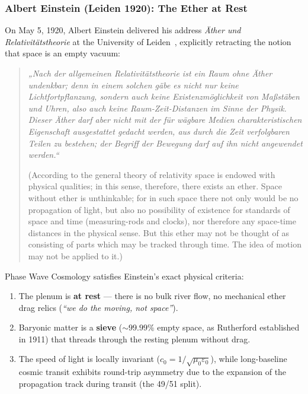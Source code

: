 \documentclass[11pt,a4paper]{article}
\begin{document}
\subsubsection{Albert Einstein (Leiden 1920): The Ether at Rest}
\label{subsubsec:einstein_leiden_1920}

On May 5, 1920, Albert Einstein delivered his address \textit{Äther und Relativitätstheorie} at the University of Leiden~\cite{Einstein1920}, explicitly retracting the notion that space is an empty vacuum:
\begin{quote}
\textit{„Nach der allgemeinen Relativitätstheorie ist ein Raum ohne Äther undenkbar; denn in einem solchen gäbe es nicht nur keine Lichtfortpflanzung, sondern auch keine Existenzmöglichkeit von Maßstäben und Uhren, also auch keine Raum-Zeit-Distanzen im Sinne der Physik. Dieser Äther darf aber nicht mit der für wägbare Medien charakteristischen Eigenschaft ausgestattet gedacht werden, aus durch die Zeit verfolgbaren Teilen zu bestehen; der Begriff der Bewegung darf auf ihn nicht angewendet werden.“}

(According to the general theory of relativity space is endowed with physical qualities; in this sense, therefore, there exists an ether. Space without ether is unthinkable; for in such space there not only would be no propagation of light, but also no possibility of existence for standards of space and time (measuring-rods and clocks), nor therefore any space-time distances in the physical sense. But this ether may not be thought of as consisting of parts which may be tracked through time. The idea of motion may not be applied to it.)
\end{quote}

Phase Wave Cosmology satisfies Einstein's exact physical criteria:
\begin{enumerate}
    \item The plenum is \textbf{at rest} --- there is no bulk river flow, no mechanical ether drag relics (\textit{``we do the moving, not space''}).
    \item Baryonic matter is a \textbf{sieve} ($\sim 99.99\%$ empty space, as Rutherford established in 1911) that threads through the resting plenum without drag.
    \item The speed of light is locally invariant ($c_0 = 1/\sqrt{\mu_0\varepsilon_0}$), while long-baseline cosmic transit exhibits round-trip asymmetry due to the expansion of the propagation track during transit (the 49/51 split).
\end{enumerate}
\end{document}
